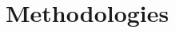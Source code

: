 \documentclass[acmsmall, screen]{acmart}
\begin{document}

\section{Methodologies}\label{sec:method}
\end{document}
